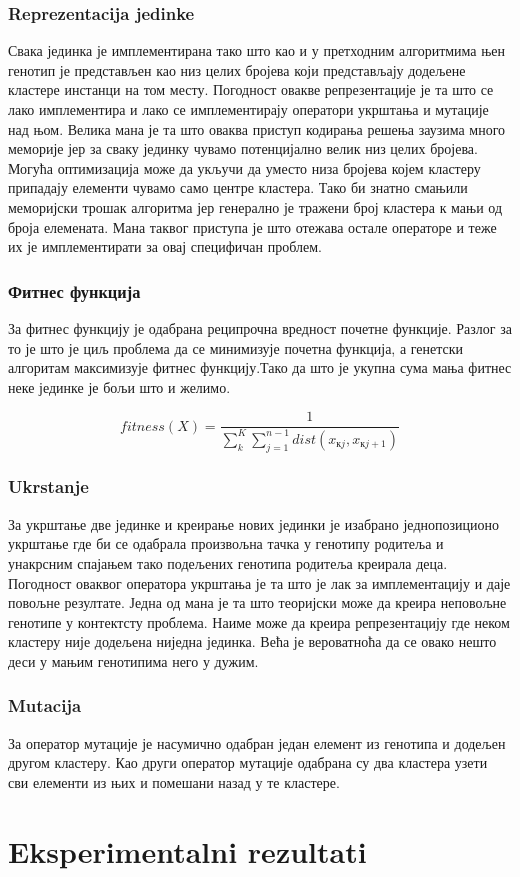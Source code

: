 \documentclass{article}
\begin{document}
 \subsubsection{Reprezentacija jedinke}
 Свака јединка је имплементирана тако што као и у претходним алгоритмима њен генотип је представљен као низ целих бројева који представљају додељене кластере инстанци на том месту.
 Погодност овакве репрезентације је та што се лако имплементира и лако се имплементирају оператори укрштања и мутације над њом.
 Велика мана је та што оваква приступ кодирања решења заузима много меморије јер за сваку јединку чувамо потенцијално велик низ целих бројева.
 Могућа оптимизација може да укључи да уместо низа бројева којем кластеру припадају елементи чувамо само центре кластера.
 Тако би знатно смањили меморијски трошак алгоритма јер генерално је тражени број кластера к мањи од броја елемената.
 Мана таквог приступа је што отежава остале операторе и теже их је имплементирати за овај специфичан проблем.
 
 \subsubsection{Фитнес функција}
 За фитнес функцију је одабрана реципрочна вредност почетне функције.
 Разлог за то је што је циљ проблема да се минимизује почетна функција, а генетски алгоритам максимизује фитнес функцију.Тако да што је укупна сума мања фитнес неке јединке је бољи што и желимо.
 
 \begin{displaymath}
fitness(X) = \frac{1}{\sum_{k}^{K}\sum_{j=1}^{n-1}dist(x_{кj},x_{кj+1})}
\end{displaymath}
 
 \subsubsection{Ukrstanje}
 За укрштање две јединке и креирање нових јединки је изабрано једнопозиционо укрштање где би се одабрала произвољна тачка у генотипу родитеља и унакрсним спајањем тако подељених генотипа родитеља креирала деца.
 Погодност оваквог оператора укрштања је та што је лак за имплементацију и даје повољне резултате.
 Једна од мана је та што теоријски може да креира неповољне генотипе у контектсту проблема.
 Наиме може да креира репрезентацију где неком кластеру није додељена ниједна јединка.
 Већа је вероватноћа да се овако нешто деси у мањим генотипима него у дужим.
 
 \subsubsection{Mutacija}
 За оператор мутације је насумично одабран један елемент из генотипа и додељен другом кластеру.
 Као други оператор мутације одабрана су два кластера узети сви елементи из њих и помешани назад у те кластере.
 
\section{Eksperimentalni rezultati}

\appendix

\newpage

\iffalse
 

\fi

\begin{thebibliography}{Literatura}

\end{thebibliography}
\end{document}

